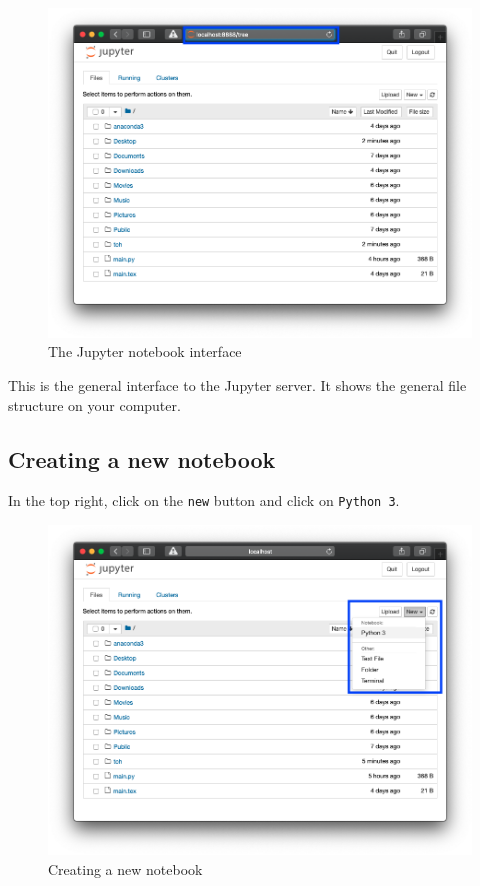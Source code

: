 \begin{figure}[htbp]
\centering
    \includegraphics[width=0.750\linewidth]{assets/the_jupyter_interface/main.png}
    \caption{The Jupyter notebook interface}
\end{figure}

This is the general interface to the Jupyter server. It shows the general file
structure on your computer.


\subsection{Creating a new notebook}
In the top right, click on the \texttt{new} button and click on \texttt{Python 3}.

\begin{figure}[htbp]
\centering
    \includegraphics[width=0.750\linewidth]{assets/creating_a_new_notebook/main.png}
    \caption{Creating a new notebook}
\end{figure}

